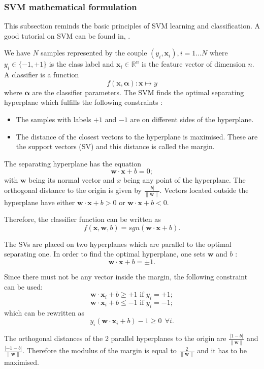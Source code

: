 \subsubsection{SVM mathematical formulation}

This subsection reminds the basic principles of SVM learning and
classification. A good tutorial on SVM can be found in, \cite{burges}.
 
We have $N$ samples represented by the couple $(y_i,\mathbf{x}_i),
i=1\ldots N$ where $y_i \in \{-1,+1\}$ is the class label and
$\mathbf{x}_i \in \mathbb{R}^n$ is the feature vector of dimension
$n$. A classifier is a function  $$f(\mathbf{x},\boldsymbol{\alpha}) :
\mathbf{x}\mapsto y$$ where $\boldsymbol{\alpha}$ are the classifier
parameters. The SVM finds the optimal separating hyperplane which
fulfills the following constraints :
    \begin{itemize}
      \item The samples with labels $+1$ and $-1$ are on different
      sides of the hyperplane.
      \item The distance of the closest vectors to the hyperplane is
      maximised. These are the support vectors (SV) and this distance is
      called the margin.
    \end{itemize}

    The separating hyperplane has the equation
    $$\mathbf{w}\cdot\mathbf{x}+b=0;$$ with $\mathbf{w}$ being its
    normal vector and $x$ being any point of the hyperplane. The
    orthogonal distance to the origin is given by
    $\frac{|b|}{\|\mathbf{w}\|}$. Vectors located outside the
    hyperplane have either $\mathbf{w}\cdot\mathbf{x}+b>0$ or
      $\mathbf{w}\cdot\mathbf{x}+b<0$.

    Therefore, the classifier function can be written as
    $$f(\mathbf{x},\mathbf{w}, b)=sgn(\mathbf{w}\cdot\mathbf{x}+b).$$
    
The SVs are placed on two hyperplanes which are parallel to the
      optimal separating one. In order to find the optimal
      hyperplane, one sets $\mathbf{w}$ and
      $b$ : $$\mathbf{w}\cdot\mathbf{x}+b=\pm 1.$$

Since there must not be any vector inside the margin, the following
constraint can be used:
    $$\mathbf{w}\cdot\mathbf{x}_i+b\ge +1\text{ if }y_i=+1;$$
    $$\mathbf{w}\cdot\mathbf{x}_i+b\le -1\text{ if }y_i=-1;$$ which
    can be rewritten as $$y_i(\mathbf{w}\cdot\mathbf{x}_i+b)-1\ge 0~  ~ \forall i.$$

    The orthogonal distances of the 2 parallel hyperplanes to the
    origin are $\frac{|1-b|}{\|\mathbf{w}\|}$ and
      $\frac{|-1-b|}{\|\mathbf{w}\|}$. Therefore the modulus of the
    margin is equal to $\frac{2}{\|\mathbf{w}\|}$ and it has to be
    maximised.

